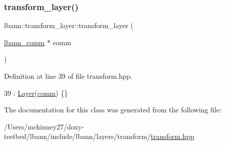 \subsubsection{\texorpdfstring{transform\+\_\+layer()}{transform\_layer()}}
{\footnotesize\ttfamily lbann\+::transform\+\_\+layer\+::transform\+\_\+layer (\begin{DoxyParamCaption}\item[{\hyperlink{classlbann_1_1lbann__comm}{lbann\+\_\+comm} $\ast$}]{comm }\end{DoxyParamCaption})\hspace{0.3cm}{\ttfamily [inline]}}



Definition at line 39 of file transform.\+hpp.


\begin{DoxyCode}
39 : \hyperlink{classlbann_1_1Layer_a24e9c82354a0a2af1b70cbca2211e7d4}{Layer}(\hyperlink{file__io_8cpp_ab048c6f9fcbcfaa57ce68b00263dbebe}{comm}) \{\}
\end{DoxyCode}


The documentation for this class was generated from the following file\+:\begin{DoxyCompactItemize}
\item 
/\+Users/mckinney27/doxy-\/testbed/lbann/include/lbann/layers/transform/\hyperlink{transform_8hpp}{transform.\+hpp}\end{DoxyCompactItemize}
